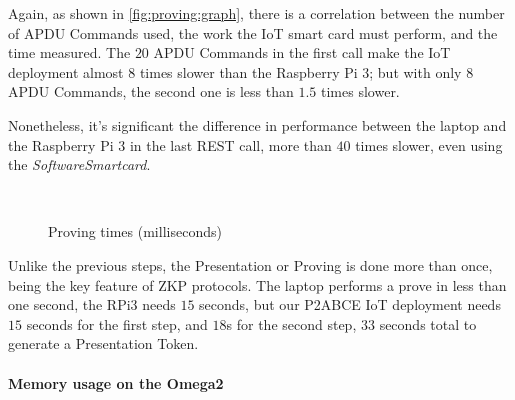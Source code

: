\documentclass[journal]{IEEEtran}
\begin{document}
Again, as shown in \autoref{fig:proving:graph}, there is a correlation between the number of APDU Commands used, the work the IoT smart card must perform, and the time measured. The $20$ APDU Commands in the first call make the IoT deployment almost $8$ times slower than the Raspberry Pi 3; but with only $8$ APDU Commands, the second one is less than $1.5$ times slower.

Nonetheless, it's significant the difference in performance between the laptop and the Raspberry Pi 3 in the last REST call, more than $40$ times slower, even using the \textit{SoftwareSmartcard}.


\begin{figure}[bth]
	\myfloatalign
	 \quad
	 \\
	\caption{Proving times (milliseconds)}
	\label{fig:proving:graph}
\end{figure}

Unlike the previous steps, the Presentation or Proving is done more than once, being the key feature of ZKP protocols. The laptop performs a prove in less than one second, the RPi3 needs $15$ seconds, but our P2ABCE IoT deployment needs $15$ seconds for the first step, and $18$s for the second step, $33$ seconds total to generate a Presentation Token.




\hfil

\paragraph{Memory usage on the Omega2}\hfil
\end{document}
